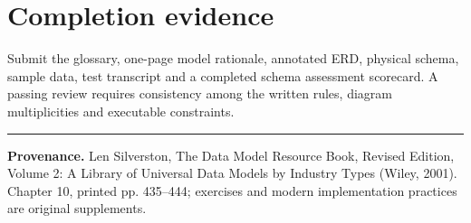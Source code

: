 \documentclass[11pt,letterpaper]{article}
\begin{document}
\section{Completion evidence}
Submit the glossary, one-page model rationale, annotated ERD, physical schema, sample data, test transcript and a completed schema assessment scorecard. A passing review requires consistency among the written rules, diagram multiplicities and executable constraints.


\vfill
\hrule
{\footnotesize\textbf{Provenance.} Len Silverston, The Data Model Resource Book, Revised Edition, Volume 2: A Library of Universal Data Models by Industry Types (Wiley, 2001). Chapter 10, printed pp. 435--444; exercises and modern implementation practices are original supplements.}
\end{document}
